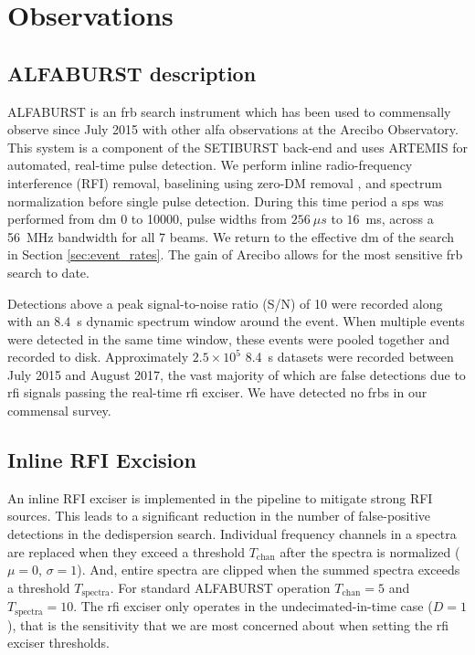 \documentclass[a4paper,fleqn,usenatbib]{mnras}
\begin{document}
\section{Observations}
\label{sec:overview}

\subsection{ALFABURST description}

ALFABURST is an \gls{frb} search instrument which has been used to commensally
observe since July 2015 with other \gls{alfa} observations at the Arecibo
Observatory. This system is a component of the SETIBURST back-end
\citep{2017ApJS..228...21C} and uses ARTEMIS \citep{2015MNRAS.452.1254K} for
automated, real-time pulse detection. We perform inline radio-frequency
interference (RFI) removal, baselining using zero-DM removal
\citep{2009MNRAS.395..410E}, and spectrum normalization before single pulse
detection. During this time period a \gls{sps} was performed from \gls{dm} 0 to
10000, pulse widths from $256~\mu s$ to $16$~ms, across a 56~MHz bandwidth for
all 7 beams. We return to the effective \gls{dm} of the search in Section
\ref{sec:event_rates}. The gain of Arecibo allows for the most sensitive
\gls{frb} search to date.

Detections above a peak signal-to-noise ratio (S/N) of 10 were recorded along
with an $8.4$~s dynamic spectrum window around the event. When multiple events
were detected in the same time window, these events were pooled together and
recorded to disk.  Approximately $2.5 \times 10^5$ 8.4~s datasets were recorded
between July 2015 and August 2017, the vast majority of which are false
detections due to \gls{rfi} signals passing the real-time \gls{rfi} exciser. We
have detected no \glspl{frb} in our commensal survey.


\subsection{Inline RFI Excision}
\label{sec:rfi_excise}

An inline RFI exciser is implemented in the pipeline to mitigate strong RFI
sources. This leads to a significant reduction in the number of false-positive
detections in the dedispersion search.  Individual frequency channels in a
spectra are replaced when they exceed a threshold $T_{\textrm{chan}}$ after the
spectra is normalized ($\mu=0$, $\sigma=1$). And, entire spectra are clipped
when the summed spectra exceeds a threshold $T_{\textrm{spectra}}$. For standard
ALFABURST operation $T_{\textrm{chan}} = 5$ and $T_{\textrm{spectra}} = 10$.
The \gls{rfi} exciser only operates in the undecimated-in-time case ($D=1$), that
is the sensitivity that we are most concerned about when setting the \gls{rfi}
exciser thresholds.
\end{document}
